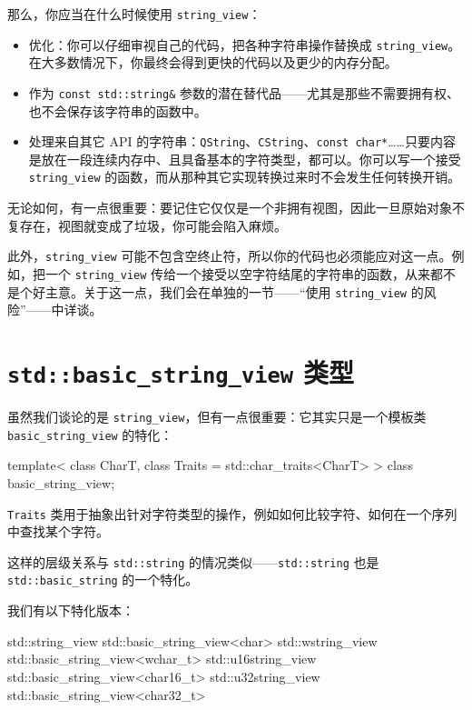 那么，你应当在什么时候使用 \texttt{string\_view}：

\begin{itemize}
\item 优化：你可以仔细审视自己的代码，把各种字符串操作替换成 \texttt{string\_view}。在大多数情况下，你最终会得到更快的代码以及更少的内存分配。
\item 作为 \texttt{const std::string\&} 参数的潜在替代品——尤其是那些不需要拥有权、也不会保存该字符串的函数中。
\item 处理来自其它 API 的字符串：\texttt{QString}、\texttt{CString}、\texttt{const char*}……只要内容是放在一段连续内存中、且具备基本的字符类型，都可以。你可以写一个接受 \texttt{string\_view} 的函数，而从那种其它实现转换过来时不会发生任何转换开销。
\end{itemize}

无论如何，有一点很重要：要记住它仅仅是一个非拥有视图，因此一旦原始对象不复存在，视图就变成了垃圾，你可能会陷入麻烦。

此外，\texttt{string\_view} 可能不包含空终止符，所以你的代码也必须能应对这一点。例如，把一个 \texttt{string\_view} 传给一个接受以空字符结尾的字符串的函数，从来都不是个好主意。关于这一点，我们会在单独的一节——“使用 \texttt{string\_view} 的风险”——中详谈。

\section{\texttt{std::basic\_string\_view} 类型}

虽然我们谈论的是 \texttt{string\_view}，但有一点很重要：它其实只是一个模板类 \texttt{basic\_string\_view} 的特化：

\begin{codebox}[cpp]
template<
class CharT,
class Traits = std::char_traits<CharT>
> class basic_string_view;
\end{codebox}

\texttt{Traits} 类用于抽象出针对字符类型的操作，例如如何比较字符、如何在一个序列中查找某个字符。

这样的层级关系与 \texttt{std::string} 的情况类似——\texttt{std::string} 也是 \texttt{std::basic\_string} 的一个特化。

我们有以下特化版本：

\begin{codebox}[cpp]
std::string_view
std::basic_string_view<char>
std::wstring_view
std::basic_string_view<wchar_t>
std::u16string_view
std::basic_string_view<char16_t>
std::u32string_view
std::basic_string_view<char32_t>
\end{codebox}


